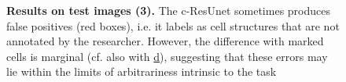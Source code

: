 \begin{figure}[ht]\ContinuedFloat
\centering
{}
\caption{\textbf{Results on test images (3).} 
The c-ResUnet sometimes produces false positives (red boxes), i.e. it labels as cell structures that are not annotated by the researcher.
However, the difference with marked cells is marginal (cf. also with \hyperref[fig:predictions:false-negatives]{d}), suggesting that these errors may lie within the limits of arbitrariness intrinsic to the task
} 
\end{figure}


